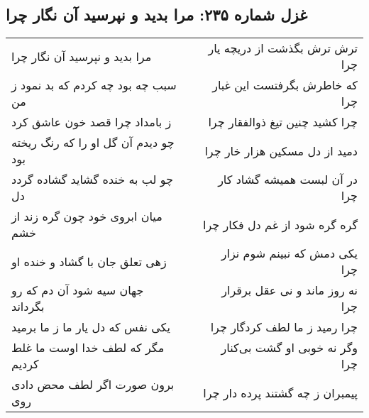 \begin{center}
\section*{غزل شماره ۲۳۵: مرا بدید و نپرسید آن نگار چرا}
\label{sec:0235}
\begin{longtable}{l p{0.5cm} r}
مرا بدید و نپرسید آن نگار چرا
&&
ترش ترش بگذشت از دریچه یار چرا
\\
سبب چه بود چه کردم که بد نمود ز من
&&
که خاطرش بگرفتست این غبار چرا
\\
ز بامداد چرا قصد خون عاشق کرد
&&
چرا کشید چنین تیغ ذوالفقار چرا
\\
چو دیدم آن گل او را که رنگ ریخته بود
&&
دمید از دل مسکین هزار خار چرا
\\
چو لب به خنده گشاید گشاده گردد دل
&&
در آن لبست همیشه گشاد کار چرا
\\
میان ابروی خود چون گره زند از خشم
&&
گره گره شود از غم دل فکار چرا
\\
زهی تعلق جان با گشاد و خنده او
&&
یکی دمش که نبینم شوم نزار چرا
\\
جهان سیه شود آن دم که رو بگرداند
&&
نه روز ماند و نی عقل برقرار چرا
\\
یکی نفس که دل یار ما ز ما برمید
&&
چرا رمید ز ما لطف کردگار چرا
\\
مگر که لطف خدا اوست ما غلط کردیم
&&
وگر نه خوبی او گشت بی‌کنار چرا
\\
برون صورت اگر لطف محض دادی روی
&&
پیمبران ز چه گشتند پرده دار چرا
\\
\end{longtable}
\end{center}
